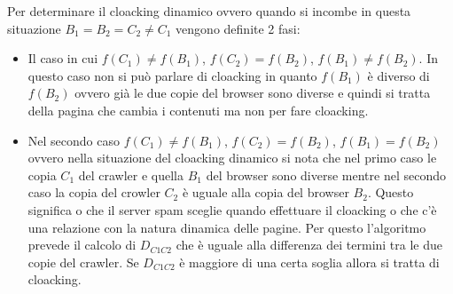 Per determinare il cloacking dinamico ovvero quando si incombe in questa situazione \(B_1=B_2=C_2 \not =C_1\) vengono definite 2 fasi:
\begin{itemize}
 \item Il caso in cui \(f(C_1)\not=f(B_1)\), \(f(C_2)=f(B_2)\), \(f(B_1)\not=f(B_2)\). In questo caso non si può parlare di cloacking in quanto \(f(B_1)\) è diverso di \(f(B_2)\) ovvero già le due copie del browser sono diverse e quindi si tratta della pagina che cambia i contenuti ma non per fare cloacking.
 \item Nel secondo caso \(f(C_1)\not=f(B_1)\), \(f(C_2)=f(B_2)\), \(f(B_1)=f(B_2)\) ovvero nella situazione del cloacking dinamico si nota che nel primo caso le copia \(C_1\) del crawler e quella \(B_1\) del browser sono diverse mentre nel secondo caso la copia del crowler \(C_2\) è uguale alla copia del browser \(B_2\). Questo significa o che il server spam sceglie quando effettuare il cloacking o che c'è una relazione con la natura dinamica delle pagine. Per questo l'algoritmo prevede il calcolo di \(D_{C1C2}\) che è uguale alla differenza dei termini tra le due copie del crawler. Se \(D_{C1C2}\) è maggiore di una certa soglia allora si tratta di cloacking.
\end{itemize}




